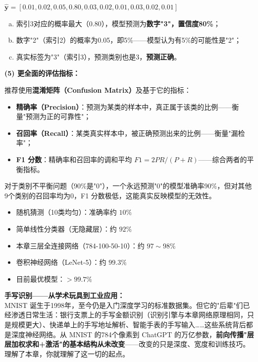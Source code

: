 \documentclass[a4paper,11pt]{ctexart}
\begin{document}
\begin{solutionbox}[参考答案与详细解析]
    $\hat{\mathbf{y}} = [0.01, 0.02, 0.05, \mathbf{0.80}, 0.03, 0.02, 0.01, 0.03, 0.02, 0.01]$

    \begin{enumerate}[a.]
        \item 索引3对应的概率最大（0.80），模型预测为\textbf{数字"3"，置信度80\%}；
        \item 数字"2"（索引2）的概率为0.05，即5\%——模型认为有5\%的可能性是"2"；
        \item 真实标签为"3"（索引3），预测类别也是3，\textbf{预测正确}。
    \end{enumerate}

    \textbf{(5) 更全面的评估指标：}

    推荐使用\textbf{混淆矩阵（Confusion Matrix）}及基于它的指标：
    \begin{itemize}
        \item \textbf{精确率（Precision）}：预测为某类的样本中，真正属于该类的比例——衡量"预测为正的可靠性"；
        \item \textbf{召回率（Recall）}：某类真实样本中，被正确预测出来的比例——衡量"漏检率"；
        \item \textbf{F1 分数}：精确率和召回率的调和平均 $F1 = 2PR/(P+R)$——综合两者的平衡指标。
    \end{itemize}
    对于类别不平衡问题（90\%是"0"），一个永远预测"0"的模型准确率90\%，但对其他9个类别的召回率均为0，F1 分数极低，这能真实反映模型的无效性。

    \begin{keybox}
        \begin{itemize}
            \item 随机猜测（10类均匀）：准确率约 $10\%$
            \item 简单线性分类器（无隐藏层）：约 $92\%$
            \item 本章三层全连接网络（784-100-50-10）：约 $97\sim98\%$
            \item 卷积神经网络（LeNet-5）：约 $99.3\%$
            \item 目前最优模型：$>99.7\%$
        \end{itemize}
    \end{keybox}
\end{solutionbox}

\begin{appbox}[现实应用场景]
    \textbf{手写识别——从学术玩具到工业应用：}\\
    MNIST 诞生于1998年，至今仍是入门深度学习的标准数据集。但它的"后辈"们已经渗透日常生活：银行支票上的手写金额识别（识别引擎与本章网络原理相同，只是规模更大）、快递单上的手写地址解析、智能手表的手写输入……这些系统背后都是深度神经网络。从 MNIST 的784个像素到 ChatGPT 的万亿参数，\textbf{前向传播"层层加权求和+激活"的基本结构从未改变}——改变的只是深度、宽度和训练技巧。理解了本章，你就理解了这一切的起点。
\end{appbox}
\end{document}
